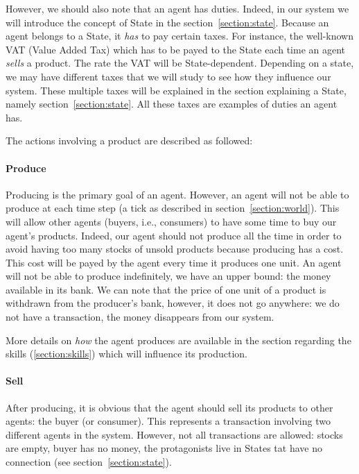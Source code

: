 \documentclass[12pt]{article}
\begin{document}
However, we should also note that an agent has duties. Indeed, in our system we will introduce the concept of State in the section~\ref{section:state}. Because an agent belongs to a State, it \emph{has} to pay certain taxes. 
For instance, the well-known VAT (Value Added Tax) which has to be payed to the State each time an agent \emph{sells} a product. The rate the VAT will be State-dependent. Depending on a state, we may have different taxes that we will study to see how they influence our system. These multiple taxes will be explained in the section explaining a State, namely section~\ref{section:state}. All these taxes are examples of duties an agent has.

The actions involving a product are described as followed:

\paragraph{Produce}
Producing is the primary goal of an agent. However, an agent will not be able to produce at each time step (a tick as described in section~\ref{section:world}).
This will allow other agents (buyers, i.e., consumers) to have some time to buy our agent's products. Indeed, our agent should not produce all the time in order to avoid having too many stocks of unsold products because producing has a cost. This cost will be payed by the agent every time it produces one unit. 
An agent will not be able to produce indefinitely, we have an upper bound: the money available in its bank. We can note that the price of one unit of a product is withdrawn from the producer's bank, however, it does not go anywhere: we do not have a transaction, the money disappears from our system.

More details on \emph{how} the agent produces are available in the section regarding the skills (\ref{section:skills}) which will influence its production.

\paragraph{Sell}
After producing, it is obvious that the agent should sell its products to other agents: the buyer (or consumer). This represents a transaction involving two different agents in the system. However, not all transactions are allowed: stocks are empty, buyer has no money, the protagonists live in States tat have no connection (see section~\ref{section:state}).
\end{document}

